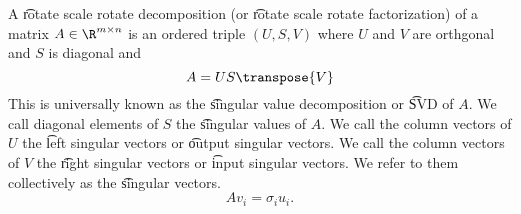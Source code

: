


A \t{rotate scale rotate decomposition} (or \t{rotate scale rotate factorization}) of a matrix $A \in \R^{m \times n}$ is an ordered triple $(U, S, V)$ where $U$ and $V$ are orthgonal and $S$ is diagonal and
\[
  A = US\transpose{V}
\]
This is universally known as the \t{singular value decomposition} or \t{SVD} of $A$.
We call diagonal elements of $S$ the \t{singular values} of $A$.
We call the column vectors of $U$ the \t{left singular vectors} or \t{output singular vectors}.
We call the column vectors of $V$ the \t{right singular vectors} or \t{input singular vectors}.
We refer to them collectively as the \t{singular vectors}.
\[
  Av_i = \sigma_i u_i.
\]

\blankpage
